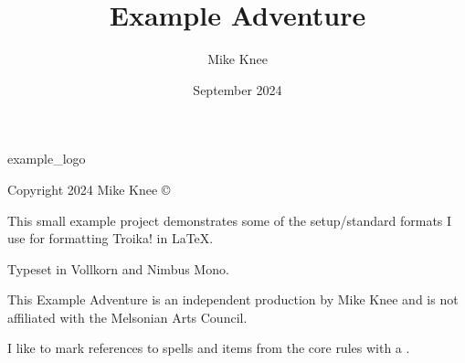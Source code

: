 \documentclass[a5paper, openany, twoside, 10pt]{memoir}
\title{Example Adventure}
\author{Mike Knee}
\date{September 2024}
\begin{document}

    
    
    



\begin{copyrightpage}{example_logo}

Copyright 2024 Mike Knee \copyright

This small example project demonstrates some of the setup/standard formats I use for formatting Troika! in \LaTeX.

Typeset in Vollkorn and Nimbus Mono.

This Example Adventure is an independent production by Mike Knee and is not affiliated with the Melsonian Arts Council.

I like to mark references to spells and items from the core  rules with a \corereference.

\end{copyrightpage}

\tableofcontents

\vfill
\pagebreak
\sloppy
\end{document}

